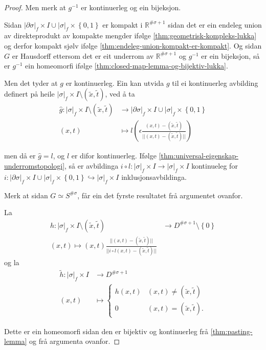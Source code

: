 \documentclass[a4paper, 12pt, norsk]{article}
\theoremstyle{plain}
\theoremstyle{definition}
\newcommand{\Rb}{\mathbb{R}}
\newcommand{\union}{ \mathop{\cup}\limits }
\newcommand{\gr}[1]{ \lvert #1 \rvert } %
\newcommand{\set}[1]{ \left\{ #1 \right\} } %
\newcommand{\tuple}[1]{ \left( #1 \right) } %
\begin{document}
\begin{proof}
	Men merk at  \( g^{-1} \) er kontinuerleg og ein bijeksjon.
	
	Sidan \( \gr{\partial\sigma}_f \times I \union \gr{\sigma}_f \times \set{0, 1} \) er kompakt i \( \Rb^{\#\sigma+1} \) sidan det er ein endeleg union av direkteprodukt av kompakte mengder ifølge \autoref{thm:geometrisk-kompleks-lukka} og derfor kompakt sjølv ifølge \autoref{thm:endeleg-union-kompakt-er-kompakt}. Og sidan \( G \) er Hausdorff ettersom det er eit underrom av \( \Rb^{\#\sigma+1} \) og \( g^{-1} \) er ein bijeksjon, så er \( g^{-1} \) ein homeomorfi ifølge \autoref{thm:closed-map-lemma-og-bijektiv-lukka}.
	
	Men det tyder at \( g \) er kontinuerleg. Ein kan utvida \( g \) til ei kontinuerleg avbilding definert på heile \( \gr{\sigma}_f \times I \setminus \tuple{\tilde{x}, \tilde{t}} \), ved å ta
	\begin{align*}
		\hat{g} : \gr{\sigma}_f \times I \setminus \tuple{\tilde{x}, \tilde{t}} &\to \gr{\partial\sigma}_f \times I \union \gr{\sigma}_f \times \set{0, 1} \\
		(x,t) &\mapsto l\tuple{\epsilon\frac{(x,t)-\tuple{\tilde{x}, \tilde{t}}}{||(x,t) - \tuple{\tilde{x}, \tilde{t}}||}}
	\end{align*}

	men då er \( \hat{g} = l \), og \( l \) er difor kontinuerleg. Ifølge \autoref{thm:universal-eigenskap-underromstopologi}, så er avbildinga \( i \circ l : \gr{\sigma}_f \times I \to \gr{\sigma}_f \times I \) kontinueleg for \( i: \gr{\partial\sigma}_f \times I \union \gr{\sigma}_f \times \set{0, 1} \hookrightarrow \gr{\sigma}_f \times I \) inklusjonsavbildinga.
	
	Merk at sidan \( G \simeq S^{\#\sigma} \), får ein det fyrste resultatet frå argumentet ovanfor.

	La
	\begin{align*}
		h: \gr{\sigma}_f \times I \setminus \tuple{\tilde{x}, \tilde{t}} &\to D^{\#\sigma+1} \setminus \set{0} \\
		(x, t) \mapsto \tuple{x, t}\frac{||(x,t) - (\tilde{x}, \tilde{t})||}{||i\circ l(x,t)-(\tilde{x}, \tilde{t})||}
	\end{align*}
	og la
	\begin{align*}
		\tilde{h}: \gr{\sigma}_f \times I &\to D^{\#\sigma+1} \\
		(x,t) &\mapsto
		\begin{cases}
			h(x,t) & (x, t) \neq (\tilde{x}, \tilde{t}) \\
			0 & (x, t) = (\tilde{x}, \tilde{t}).
		\end{cases}
	\end{align*}

	Dette er ein homeomorfi sidan den er bijektiv og kontinuerleg frå \autoref{thm:pasting-lemma} og frå argumenta ovanfor.
\end{proof}
\end{document}
